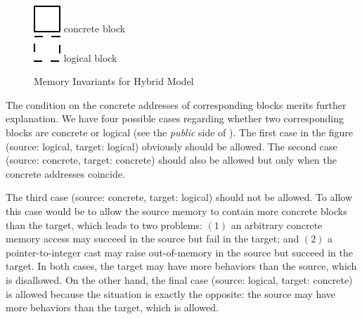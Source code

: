 \begin{figure}[t]
\center
  \begin{minipage}[b]{0.5\textwidth}
  \end{minipage}
  \begin{minipage}[b]{0.3\textwidth}
  \includegraphics[scale=0.25]{intptrcast-figure/physical-block.png} concrete block\\[2mm]
  \includegraphics[scale=0.25]{intptrcast-figure/logical-block.png} logical block\\
  \mbox{}
  \end{minipage}
\caption{Memory Invariants for Hybrid Model}\label{fig:invariant}
\end{figure}

The condition on the concrete addresses of corresponding blocks
merits further explanation. We have four possible cases
regarding whether two corresponding blocks are concrete or logical (see the
\emph{public} side of ).  The first case in
the figure (\ie source: logical, target: logical) obviously should be
allowed. The second case (\ie source: concrete, target: concrete)
should also be allowed but only when the concrete addresses
coincide. 

The third case (\ie source: concrete, target: logical) should not be
allowed. To allow this case would be to allow the source memory to contain more concrete
blocks than the target, which leads to two problems: $(1)$ an arbitrary
concrete memory access may succeed in the source but fail in the
target; and $(2)$ a pointer-to-integer cast may raise out-of-memory
in the source but succeed in the target.  In both cases, the target
may have more behaviors than the source, which is disallowed.  On the
other hand, the final case (\ie source: logical, target: concrete) is
allowed because the situation is exactly the opposite: the source may
have more behaviors than the target, which is allowed.


